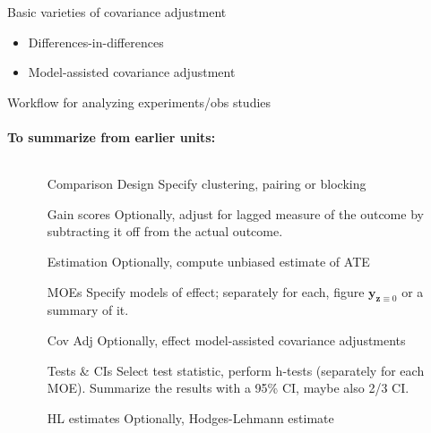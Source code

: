 \begin{frame}{Basic varieties of covariance adjustment}
  
  \begin{itemize}
   \item{} {Differences-in-differences}
  
\item {} {Model-assisted covariance adjustment}

  \end{itemize}

\end{frame}

\begin{frame}{Workflow for analyzing experiments/obs studies}
  \framesubtitle{To summarize from earlier units:}

  \begin{columns}
    \begin{column}{.25\linewidth}
      
    \end{column}
    \begin{column}{.75\linewidth}
        \begin{itemize}
  \item[Comparison Design] Specify clustering, pairing or blocking
  \item[Gain scores] Optionally, adjust for lagged measure of the outcome by subtracting it off from the actual outcome.
  \item[Estimation] Optionally, compute unbiased estimate of ATE
  \item[MOEs] Specify models of effect; separately for each, figure $\mathbf{y}_{\mathbf{z}\equiv 0} $ or a summary of it.
  \item[Cov Adj] Optionally, effect model-assisted covariance adjustments
  \item[Tests \& CIs] Select test statistic, perform h-tests (separately for each MOE). Summarize the results with a 95\% CI, maybe also 2/3 CI. 
  \item[HL estimates] Optionally, Hodges-Lehmann estimate
  \end{itemize}

    \end{column}
  \end{columns}
\end{frame}





